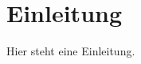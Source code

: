 
\section{Einleitung}

Hier steht eine Einleitung. \parencite{brooksbankCognitiveDissonanceRevisited2020}

\newpage